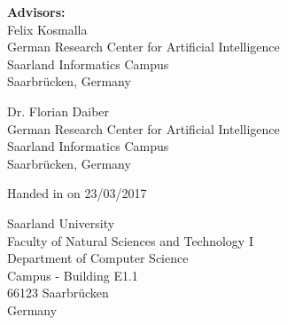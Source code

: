 \pagestyle{empty}

\vspace*{0.5cm}
\textbf{Advisors:}\\
Felix Kosmalla\\
German Research Center for Artificial Intelligence\\
Saarland Informatics Campus\\
Saarbrücken, Germany

\vspace*{0.5cm}
Dr. Florian Daiber\\
German Research Center for Artificial Intelligence\\
Saarland Informatics Campus\\
Saarbrücken, Germany


\vspace{3.5cm}
Handed in on 23/03/2017


\vspace{3.5cm}


\vspace{3cm}
Saarland University\\
Faculty of Natural Sciences and Technology I\\
Department of Computer Science\\
Campus - Building E1.1\\
66123 Saarbrücken\\
Germany\\


